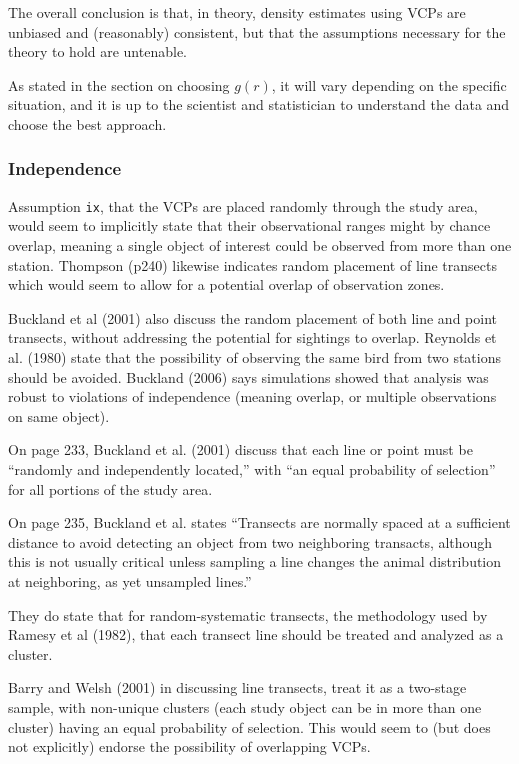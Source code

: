 \documentclass[12pt]{article}
\begin{document}
The overall conclusion is that, in theory, density estimates using VCPs are unbiased and (reasonably) consistent, but that the assumptions necessary for the theory to hold are untenable. 

As stated in the section on choosing $g(r)$, it will vary depending on the specific situation, and it is up to the scientist and statistician to understand the data and choose the best approach.

\subsubsection{Independence}
Assumption \texttt{ix}, that the VCPs are placed randomly through the study area, would seem to implicitly state that their observational ranges might by chance overlap, meaning a single object of interest could be observed from more than one station. Thompson (p240) likewise indicates random placement of line transects which would seem to allow for a potential overlap of observation zones. 

Buckland et al (2001) also discuss the random placement of both line and point transects, without addressing the potential for sightings to overlap. Reynolds et al. (1980) state that the possibility of observing the same bird from two stations should be avoided. Buckland (2006) says simulations showed that analysis was robust to violations of independence (meaning overlap, or multiple observations on same object).

On page 233, Buckland et al. (2001) discuss that each line or point must be ``randomly and independently located,'' with ``an equal probability of selection'' for all portions of the study area.

On page 235, Buckland et al. states ``Transects are normally spaced at a sufficient distance to avoid detecting an object from two neighboring transacts, although this is not usually critical unless sampling a line changes the animal distribution at neighboring, as yet unsampled lines.''

They do state that for random-systematic transects, the methodology used by Ramesy et al (1982), that each transect line should be treated and analyzed as a cluster.

Barry and Welsh (2001) in discussing line transects, treat it as a two-stage sample, with non-unique clusters (each study object can be in more than one cluster) having an equal probability of selection. This would seem to (but does not explicitly) endorse the possibility of overlapping VCPs. 
\end{document}
